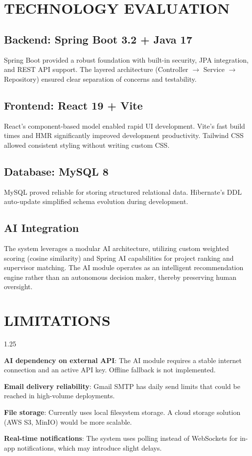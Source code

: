 \section{TECHNOLOGY EVALUATION}

\subsection{Backend: Spring Boot 3.2 + Java 17}
Spring Boot provided a robust foundation with built-in security, JPA integration, and REST API support. The layered architecture (Controller $\to$ Service $\to$ Repository) ensured clear separation of concerns and testability.

\subsection{Frontend: React 19 + Vite}
React's component-based model enabled rapid UI development. Vite's fast build times and HMR significantly improved development productivity. Tailwind CSS allowed consistent styling without writing custom CSS.

\subsection{Database: MySQL 8}
MySQL proved reliable for storing structured relational data. Hibernate's DDL auto-update simplified schema evolution during development.

\subsection{AI Integration}
The system leverages a modular AI architecture, utilizing custom weighted scoring (cosine similarity) and Spring AI capabilities for project ranking and supervisor matching. The AI module operates as an intelligent recommendation engine rather than an autonomous decision maker, thereby preserving human oversight.

\section{LIMITATIONS}
\begin{itemize}[leftmargin=2cm, topsep=4pt]
    \begin{spacing}{1.25}
        \item \textbf{AI dependency on external API}: The AI module requires a stable internet connection and an active API key. Offline fallback is not implemented.
        \item \textbf{Email delivery reliability}: Gmail SMTP has daily send limits that could be reached in high-volume deployments.
        \item \textbf{File storage}: Currently uses local filesystem storage. A cloud storage solution (AWS S3, MinIO) would be more scalable.
        \item \textbf{Real-time notifications}: The system uses polling instead of WebSockets for in-app notifications, which may introduce slight delays.
    \end{spacing}
\end{itemize}

